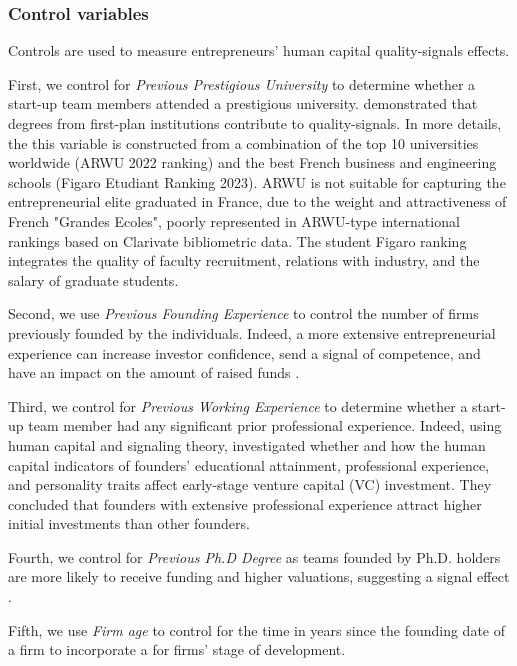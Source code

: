 \documentclass[12pt]{article}
\begin{document}
\subsubsection{Control variables}

Controls are used to measure entrepreneurs' human capital quality-signals effects.

First, we control for \textit{Previous Prestigious University} to determine whether a start-up team members attended a prestigious university. \citet{ferrary1999confiance} demonstrated that degrees from first-plan institutions contribute to quality-signals. In more details, the this variable is constructed from a combination of the top 10 universities worldwide (ARWU 2022 ranking) and the best French business and engineering schools (Figaro Etudiant Ranking 2023). ARWU is not suitable for capturing the entrepreneurial elite graduated in France, due to the weight and attractiveness of French "Grandes Ecoles", poorly represented in ARWU-type international rankings based on Clarivate bibliometric data. The student Figaro ranking integrates the quality of faculty recruitment, relations with industry, and the salary of graduate students.

Second, we use \textit{Previous Founding Experience} to control the number of firms previously founded by the individuals. Indeed, a more extensive entrepreneurial experience can increase investor confidence, send a signal of competence, and have an impact on the amount of raised funds \citep{hsu2007experienced}.

Third, we control for \textit{Previous Working Experience} to determine whether a start-up team member had any significant prior professional experience. Indeed, using human capital and signaling theory,  \citet{subramanian2022backing} investigated whether and how the human capital indicators of founders' educational attainment, professional experience, and personality traits affect early-stage venture capital (VC) investment. They concluded that founders with extensive professional experience attract higher initial investments than other founders.

Fourth, we control for \textit{Previous Ph.D Degree} as teams founded by Ph.D. holders are more likely to receive funding and higher valuations, suggesting a signal effect \citep{hsu2007experienced}.

Fifth, we use \textit{Firm age} to control for the time in years since the founding date of a firm to incorporate a for firms’ stage of development.
\end{document}
